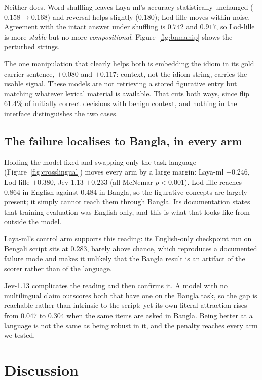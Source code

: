 \documentclass[11pt]{article}
\begin{document}
Neither does. Word-shuffling leaves Laya-ml's accuracy statistically unchanged
($0.158 \rightarrow 0.168$) and reversal helps slightly ($0.180$); Lod-lille
moves within noise. Agreement with the intact answer under shuffling is $0.742$
and $0.917$, so Lod-lille is more \emph{stable} but no more
\emph{compositional}. Figure~\ref{fig:bnmanip} shows the perturbed strings.

The one manipulation that clearly helps both is embedding the idiom in its gold
carrier sentence, $+0.080$ and $+0.117$: context, not the idiom string, carries
the usable signal. These models are not retrieving a stored figurative entry but
matching whatever lexical material is available. That cuts both ways, since
\citet{xu2026jevout} flip 61.4\% of initially correct decisions with benign
context, and nothing in the interface distinguishes the two cases.


\subsection{The failure localises to Bangla, in every arm}
\label{sec:crosslingual}

Holding the model fixed and swapping only the task language
(Figure~\ref{fig:crosslingual}) moves every arm by a large margin: Laya-ml
$+0.246$, Lod-lille $+0.380$, Jev-1.13 $+0.233$ (all McNemar $p < 0.001$).
Lod-lille reaches $0.864$ in English against $0.484$ in Bangla, so the figurative
concepts are largely present; it simply cannot reach them through Bangla. Its
documentation states that training evaluation was English-only, and this is what
that looks like from outside the model.

Laya-ml's control arm supports this reading: its English-only checkpoint run on
Bengali script sits at $0.283$, barely above chance, which reproduces a
documented failure mode and makes it unlikely that the Bangla result is an
artifact of the scorer rather than of the language.

Jev-1.13 complicates the reading and then confirms it. A model with no
multilingual claim outscores both that have one on the Bangla task, so the gap is
reachable rather than intrinsic to the script; yet its own literal attraction
rises from $0.047$ to $0.304$ when the same items are asked in Bangla. Being
better at a language is not the same as being robust in it, and the penalty
reaches every arm we tested.


\section{Discussion}
\end{document}
